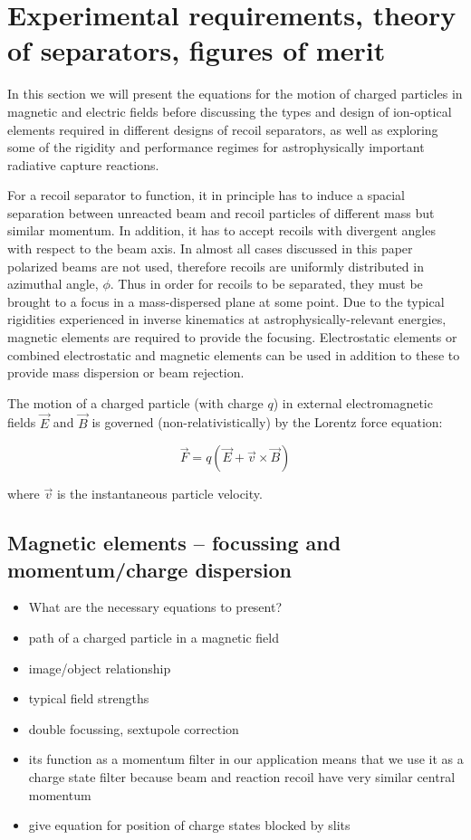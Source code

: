 \section{Experimental requirements, theory of separators, figures of merit}
\label{emsep}

In this section we will present the equations for the motion of charged particles in magnetic and electric fields before discussing the types and design of ion-optical elements required in different designs of recoil separators, as well as exploring some of the rigidity and performance regimes for astrophysically important radiative capture reactions. 

For a recoil separator to function, it in principle has to induce a spacial separation between unreacted beam and recoil particles of different mass but similar momentum. In addition, it has to accept recoils with divergent angles with respect to the beam axis. In almost all cases discussed in this paper polarized beams are not used, therefore recoils are uniformly distributed in azimuthal angle, $\phi$. 
Thus in order for recoils to be separated, they must be brought to a focus in a mass-dispersed plane at some point. Due to the typical rigidities experienced in inverse kinematics at astrophysically-relevant energies, magnetic elements are required to provide the focusing. Electrostatic elements or combined electrostatic and magnetic elements can be used in addition to these to provide mass dispersion or beam rejection.  

The motion of a charged particle (with charge $q$) in external electromagnetic fields $\vec{E}$ and $\vec{B}$  is governed (non-relativistically) by the Lorentz force equation:

\begin{equation}
\vec{F}=q(\vec{E}+\vec{v}\times\vec{B})
\end{equation}   

where $\vec{v}$ is the instantaneous particle velocity. 

\subsection{Magnetic elements -- focussing and momentum/charge dispersion}\label{magel}

\small
\begin{itemize}
\item What are the necessary equations to present?
\item path of a charged particle in a magnetic field
\item image/object relationship
\item typical field strengths
\item double focussing, sextupole correction
\item its function as a momentum filter in our application means that we use it as a charge state filter because beam and reaction recoil have very similar central momentum
\item give equation for position of charge states blocked by slits
\end{itemize}
\normalsize

